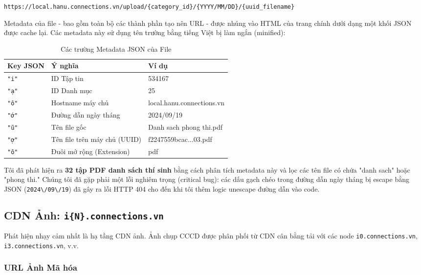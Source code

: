 \documentclass[12pt,a4paper]{article}
\begin{document}
\begin{lstlisting}[language={},title={Mẫu URL CDN tập tin}]
https://local.hanu.connections.vn/upload/{category_id}/{YYYY/MM/DD}/{uuid_filename}
\end{lstlisting}

\noindent Metadata của file - bao gồm toàn bộ các thành phần tạo nên URL - được nhúng vào HTML của trang chính dưới dạng một khối JSON được cache lại. Các metadata này sử dụng tên trường bằng tiếng Việt bị làm ngắn (minified):

\begin{table}[H]
\centering
\caption{Các trường Metadata JSON của File}
\label{tab:file-metadata}
\begin{tabular}{@{}lll@{}}
\toprule
\textbf{Key JSON} & \textbf{Ý nghĩa} & \textbf{Ví dụ} \\
\midrule
\texttt{"i"} & ID Tập tin & 534167 \\
\texttt{"ạ"} & ID Danh mục & 25 \\
\texttt{"ô"} & Hostname máy chủ & local.hanu.connections.vn \\
\texttt{"ớ"} & Đường dẫn ngày tháng & 2024/09/19 \\
\texttt{"ũ"} & Tên file gốc & Danh sach phong thi.pdf \\
\texttt{"ợ"} & Tên file trên máy chủ (UUID) & f2247559bcac...03.pdf \\
\texttt{"ô"} & Đuôi mở rộng (Extension) & pdf \\
\bottomrule
\end{tabular}
\end{table}

\noindent Tôi đã phát hiện ra \textbf{32 tập PDF danh sách thí sinh} bằng cách phân tích metadata này và lọc các tên file có chứa "danh sach" hoặc "phong thi." Chúng tôi đã gặp phải một lỗi nghiêm trọng (critical bug): các dấu gạch chéo trong đường dẫn ngày tháng bị escape bằng JSON (\texttt{2024\textbackslash/09\textbackslash/19}) đã gây ra lỗi HTTP 404 cho đến khi tôi thêm logic unescape đường dẫn vào code.

\subsection{CDN Ảnh: \texttt{i\{N\}.connections.vn}}

Phát hiện nhạy cảm nhất là hạ tầng CDN ảnh. Ảnh chụp CCCD được phân phối từ CDN cân bằng tải với các node \texttt{i0.connections.vn}, \texttt{i3.connections.vn}, v.v.

\subsubsection{URL Ảnh Mã hóa}
\end{document}
